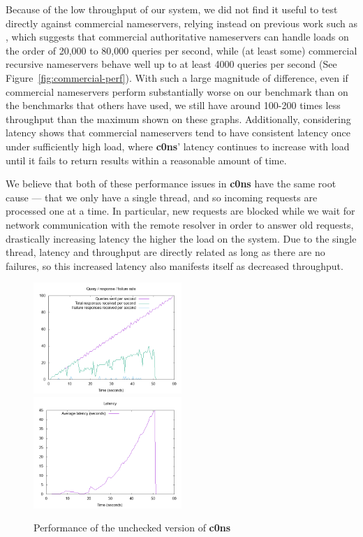 \documentclass{article}
\newcommand\Kwd[1]{{\sffamily\bfseries{#1}}}
\begin{document}
Because of the low throughput of our system, we did not find it useful to test directly against commercial nameservers, relying instead on previous work such as \cite{fagin2017making}, which suggests that commercial authoritative nameservers can handle loads on the order of 20,000 to 80,000 queries per second, while (at least some) commercial recursive nameservers behave well up to at least 4000 queries per second (See Figure~\ref{fig:commercial-perf}). With such a large magnitude of difference, even if commercial nameservers perform substantially worse on our benchmark than on the benchmarks that others have used, we still have around 100-200 times less throughput than the maximum shown on these graphs. Additionally, considering latency shows that commercial nameservers tend to have consistent latency once under sufficiently high load, where \Kwd{c0ns}' latency continues to increase with load until it fails to return results within a reasonable amount of time.

We believe that both of these performance issues in \Kwd{c0ns} have the same root cause --- that we only have a single thread, and so incoming requests are processed one at a time. In particular, new requests are blocked while we wait for network communication with the remote resolver in order to answer old requests, drastically increasing latency the higher the load on the system. Due to the single thread, latency and throughput are directly related as long as there are no failures, so this increased latency also manifests itself as decreased throughput.

\begin{figure}[h]
    \includegraphics[width=0.5\textwidth]{unchecked_rate.png}
    \includegraphics[width=0.5\textwidth]{unchecked_latency.png}
    \caption{Performance of the unchecked version of \Kwd{c0ns}}\label{fig:unchecked-perf}
\end{figure}
\end{document}
